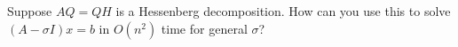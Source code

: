 \documentclass[12pt, leqno]{article}
\begin{document}

Suppose $AQ = QH$ is a Hessenberg decomposition.  How can you use this to solve
$(A-\sigma I) x = b$ in $O(n^2)$ time for general $\sigma$?
\end{document}
